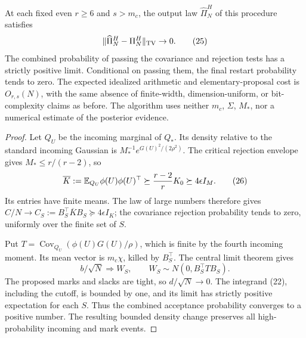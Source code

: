 \begin{theorem}
At each fixed even $r\ge6$ and $s>m_c$, the output law
$\widehat\Pi_N^H$ of this procedure satisfies
\[
                   \|\widehat\Pi_N^H-\Pi_N^H\|_{\rm TV}\to0.
 \tag{25}
\]
The combined probability of passing the covariance and rejection tests
has a strictly positive limit. Conditional on passing them, the final
restart probability tends to zero. The expected idealized arithmetic
and elementary-proposal cost is $O_{r,s}(N)$, with the same absence of
finite-width, dimension-uniform, or bit-complexity claims as before.
The algorithm uses neither $m_c$, $\Sigma$, $M_*$, nor a numerical
estimate of the posterior evidence.
\end{theorem}
\begin{proof}
Let $Q_U$ be the incoming marginal of $Q_*$. Its density relative to the
standard incoming Gaussian is $M_*^{-1}e^{G(U)^2/(2\rho^2)}$.
The critical rejection envelope gives $M_*\le r/(r-2)$, so
\[
 \overline K:=\mathbb E_{Q_U}\phi(U)\phi(U)^\top
                      \succeq\frac{r-2}{r}K_0\succeq4\epsilon I_M.
 \tag{26}
\]
Its entries have finite means. The law of large numbers therefore gives
$C/N\to C_S:=B_S^\top\overline K B_S\succeq4\epsilon I_K$;
the covariance rejection probability tends to zero, uniformly over the
finite set of $S$.

Put $T=\operatorname{Cov}_{Q_U}(\phi(U)G(U)/\rho)$, which is finite
by the fourth incoming moment. Its mean vector is $m_c\chi$, killed
by $B_S^\top$. The central limit theorem gives
\[
             b/\sqrt N\Longrightarrow W_S,
                         \qquad W_S\sim N(0,B_S^\top T B_S).
\]
The proposed marks and slacks are tight, so $d/\sqrt N\to0$.
The integrand (22), including the cutoff, is bounded by one, and its
limit has strictly positive expectation for each $S$. Thus the combined
acceptance probability converges to a positive number. The resulting
bounded density change preserves all high-probability incoming and
mark events.


\end{proof}

